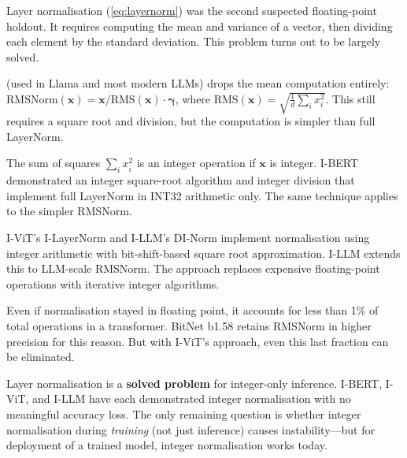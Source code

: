 Layer normalisation (\cref{eq:layernorm}) was the second
suspected floating-point holdout. It requires computing the mean and
variance of a vector, then dividing each element by the standard
deviation. This problem turns out to be largely solved.

\begin{description}[leftmargin=1em]
  \item[RMSNorm] (used in Llama and most modern LLMs) drops the
    mean computation entirely:
    $\text{RMSNorm}(\bm{x}) = \bm{x} / \text{RMS}(\bm{x}) \cdot \bm{\gamma}$,
    where $\text{RMS}(\bm{x}) = \sqrt{\frac{1}{d}\sum_i x_i^2}$.
    This still requires a square root and division, but the
    computation is simpler than full LayerNorm.

  \item[Integer LayerNorm (I-BERT~\cite{kim2021ibert}).]
    The sum of squares $\sum_i x_i^2$ is an integer operation if
    $\bm{x}$ is integer. I-BERT demonstrated an integer square-root
    algorithm and integer division that implement full LayerNorm
    in INT32 arithmetic only. The same technique applies to the
    simpler RMSNorm.

  \item[Integer LayerNorm via bit-shifts (I-ViT~\cite{li2022ivit},
    I-LLM~\cite{hu2024illm}).] I-ViT's I-LayerNorm and
    I-LLM's DI-Norm implement normalisation using integer
    arithmetic with bit-shift-based square root approximation.
    I-LLM extends this to LLM-scale RMSNorm. The approach
    replaces expensive floating-point operations with iterative
    integer algorithms.

  \item[Pragmatic argument.] Even if normalisation stayed in
    floating point, it accounts for less than 1\% of total
    operations in a transformer. BitNet b1.58 retains RMSNorm
    in higher precision for this reason. But with I-ViT's
    approach, even this last fraction can be eliminated.
\end{description}

\begin{engineernote}
Layer normalisation is a \textbf{solved problem} for integer-only
inference. I-BERT, I-ViT, and I-LLM have each demonstrated integer
normalisation with no meaningful accuracy loss. The only remaining
question is whether integer normalisation during \emph{training}
(not just inference) causes instability---but for deployment of a
trained model, integer normalisation works today.
\end{engineernote}

